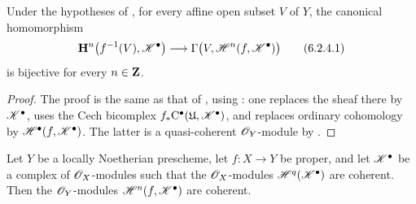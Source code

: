 \begin{corollary}[6.2.4]
\label{III.6.2.4}
Under the hypotheses of , for every affine open
subset $V$ of $Y$, the canonical homomorphism
\[
  \mathbf{H}^n\bigl(f^{-1}(V),\mathscr{K}^\bullet\bigr)
  \longrightarrow
  \Gamma\bigl(V,\mathscr{H}^n(f,\mathscr{K}^\bullet)\bigr)
  \tag{6.2.4.1}\label{III.6.2.4.1}
\]
is bijective for every $n\in\mathbf{Z}$.
\end{corollary}

\begin{proof}
The proof is the same as that of , using
: one replaces the sheaf there by
$\mathscr{K}^\bullet$, uses the Cech bicomplex
$f_*\mathrm{C}^\bullet(\mathfrak{U},\mathscr{K}^\bullet)$, and replaces
ordinary cohomology by
$\mathscr{H}^\bullet(f,\mathscr{K}^\bullet)$.  The latter is a
quasi-coherent $\mathscr{O}_Y$-module by .
\end{proof}

\begin{proposition}[6.2.5]
\label{III.6.2.5}
Let $Y$ be a locally Noetherian prescheme, let $f:X\to Y$ be
proper, and let $\mathscr{K}^\bullet$ be a complex of
$\mathscr{O}_X$-modules such that the $\mathscr{O}_X$-modules
$\mathscr{H}^q(\mathscr{K}^\bullet)$ are coherent.  Then the
$\mathscr{O}_Y$-modules $\mathscr{H}^n(f,\mathscr{K}^\bullet)$ are
coherent.
\end{proposition}

